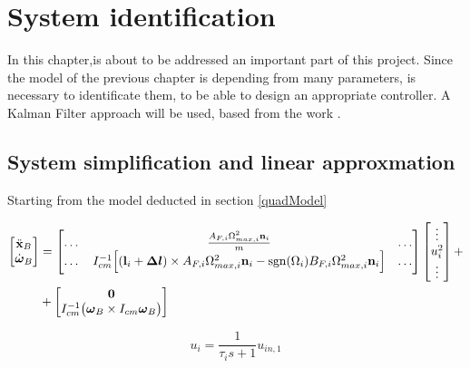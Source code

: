 \chapter{System identification}
\label{systemIdentification}

In this chapter,is about to be addressed an important part of this project. Since the model of the previous chapter is depending from many parameters, is necessary to identificate them, to be able to design an appropriate controller. A Kalman Filter approach will be used, based from the work \cite{modelIdentification}.

\section{System simplification and linear approxmation}
\label{linearization}

Starting from the model deducted in section \ref{quadModel}

\begin{equation}
	\begin{split}
		\begin{bmatrix}
			\ddot{\mathbf{x}}_B \\
			\dot{\boldsymbol{\omega}}_B
		\end{bmatrix}
		&=
		\begin{bmatrix}
			\dots & \frac{A_{F,i}\Omega_{max,i}^2\mathbf{n}_i}{m} & \dots \\
			\dots & I_{cm}^{-1}\Big[ (\mathbf{l}_i+\boldsymbol{\Delta l})\times A_{F,i}\Omega^2_{max,i}\mathbf{n}_i-\operatorname*{sgn}(\Omega_i)B_{F,i}\Omega_{max,i}^2\mathbf{n}_i\Big] & \dots
		\end{bmatrix}
		\begin{bmatrix}
			\vdots \\
			u_i^2 \\
			\vdots
		\end{bmatrix}
		+ \\
		&+
		\begin{bmatrix}
			\mathbf{0} \\
			I_{cm}^{-1}\bigl(\boldsymbol{\omega}_B \times I_{cm} \boldsymbol{\omega}_B \bigl)
		\end{bmatrix} \\
	\end{split}
	\label{eq:finalModel1a}
\end{equation}

\begin{equation}
	u_i = \frac{1}{\tau_is+1}u_{in,1}
	\label{eq:finalModel2a}
\end{equation}

